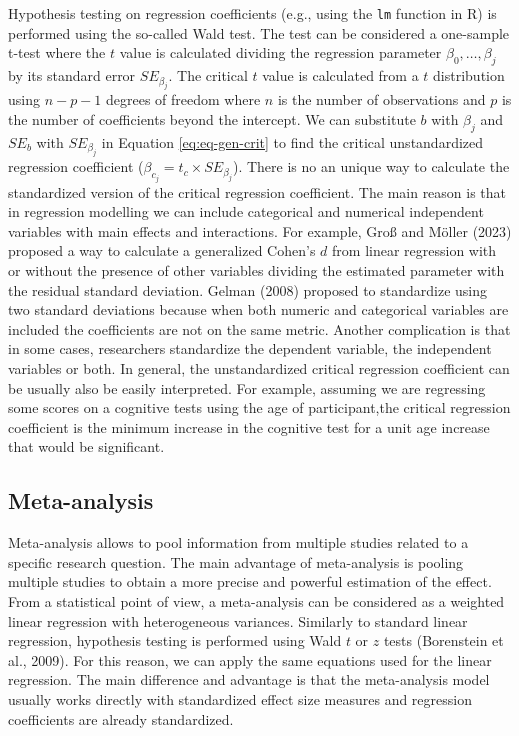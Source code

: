 \documentclass[
  man]{apa7}
\begin{document}
Hypothesis testing on regression coefficients (e.g., using the \texttt{lm} function in R) is performed using the so-called Wald test. The test can be considered a one-sample t-test where the \(t\) value is calculated dividing the regression parameter \(\beta_0, \dots, \beta_j\) by its standard error \(SE_{\beta_j}\). The critical \(t\) value is calculated from a \(t\) distribution using \(n - p - 1\) degrees of freedom where \(n\) is the number of observations and \(p\) is the number of coefficients beyond the intercept. We can substitute \(b\) with \(\beta_j\) and \(SE_{b}\) with \(SE_{\beta_j}\) in Equation \eqref{eq:eq-gen-crit} to find the critical unstandardized regression coefficient (\(\beta_{c_j} = t_c \times SE_{\beta_j}\)). There is no an unique way to calculate the standardized version of the critical regression coefficient. The main reason is that in regression modelling we can include categorical and numerical independent variables with main effects and interactions. For example, Groß and Möller (2023) proposed a way to calculate a generalized Cohen's \(d\) from linear regression with or without the presence of other variables dividing the estimated parameter with the residual standard deviation. Gelman (2008) proposed to standardize using two standard deviations because when both numeric and categorical variables are included the coefficients are not on the same metric. Another complication is that in some cases, researchers standardize the dependent variable, the independent variables or both. In general, the unstandardized critical regression coefficient can be usually also be easily interpreted. For example, assuming we are regressing some scores on a cognitive tests using the age of participant,the critical regression coefficient is the minimum increase in the cognitive test for a unit age increase that would be significant.

\hypertarget{meta-analysis}{%
\subsection{Meta-analysis}\label{meta-analysis}}

Meta-analysis allows to pool information from multiple studies related to a specific research question. The main advantage of meta-analysis is pooling multiple studies to obtain a more precise and powerful estimation of the effect. From a statistical point of view, a meta-analysis can be considered as a weighted linear regression with heterogeneous variances. Similarly to standard linear regression, hypothesis testing is performed using Wald \(t\) or \(z\) tests (Borenstein et al., 2009). For this reason, we can apply the same equations used for the linear regression. The main difference and advantage is that the meta-analysis model usually works directly with standardized effect size measures and regression coefficients are already standardized.
\end{document}

